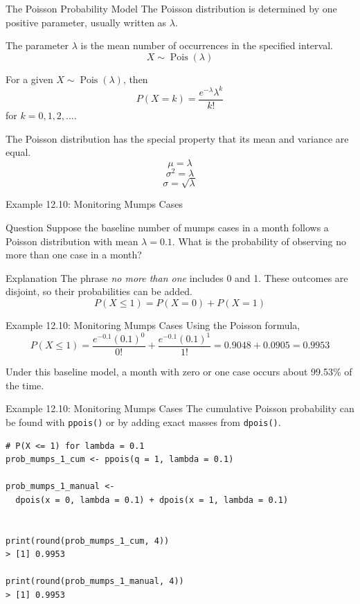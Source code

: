 \documentclass[aspectratio=169]{beamer}
\begin{document}
\begin{frame}{The Poisson Probability Model}
The Poisson distribution is determined by one positive parameter, usually written as $\lambda$.

\vspace{0.15cm}
The parameter $\lambda$ is the mean number of occurrences in the specified interval.
$$X \sim \operatorname{Pois}(\lambda)$$

For a given $X \sim \operatorname{Pois}(\lambda)$, then
$$P(X=k)=\frac{e^{-\lambda}\lambda^k}{k!}$$
for $k=0,1,2,\ldots$.

\vspace{0.2cm}
The Poisson distribution has the special property that its mean and variance are equal.
$$\mu=\lambda$$
$$\sigma^2=\lambda$$
$$\sigma=\sqrt{\lambda}$$
\end{frame}

\begin{frame}{Example 12.10: Monitoring Mumps Cases}
\begin{block}{Question}
Suppose the baseline number of mumps cases in a month follows a Poisson distribution with mean $\lambda=0.1$. What is the probability of observing no more than one case in a month?
\end{block}
\begin{block}{Explanation}
The phrase \textit{no more than one} includes 0 and 1. These outcomes are disjoint, so their probabilities can be added.
$$P(X\le 1)=P(X=0)+P(X=1)$$
\end{block}
\end{frame}

\begin{frame}{Example 12.10: Monitoring Mumps Cases}
Using the Poisson formula,
$$P(X\le 1)=\frac{e^{-0.1}(0.1)^0}{0!}+\frac{e^{-0.1}(0.1)^1}{1!} = 0.9048+0.0905 =0.9953$$

Under this baseline model, a month with zero or one case occurs about 99.53\% of the time.
\end{frame}

\begin{frame}[fragile]{Example 12.10: Monitoring Mumps Cases}
The cumulative Poisson probability can be found with \texttt{ppois()} or by adding exact masses from \texttt{dpois()}.

\small
\begin{verbatim}
# P(X <= 1) for lambda = 0.1
prob_mumps_1_cum <- ppois(q = 1, lambda = 0.1)

prob_mumps_1_manual <-
  dpois(x = 0, lambda = 0.1) + dpois(x = 1, lambda = 0.1)


print(round(prob_mumps_1_cum, 4))
> [1] 0.9953

print(round(prob_mumps_1_manual, 4))
> [1] 0.9953
\end{verbatim}
\normalsize
\end{frame}
\end{document}
